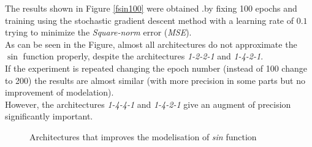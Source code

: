 \documentclass[a4paper, 11pt]{article}
\begin{document}
The results shown in Figure \ref{fsin100} were obtained 
.by fixing 100 epochs and training using the stochastic gradient descent method with a learning rate of $0.1$ trying to minimize the \textit{Square-norm} error (\textit{MSE}).\\
As can be seen in the Figure, almost all architectures do not approximate the $\sin$ function properly, despite the architectures \textit{1-2-2-1} and \textit{1-4-2-1}.\\
If the experiment is repeated changing the epoch number (instead of 100 change to 200) the results are almost similar (with more precision in some parts but no improvement of modelation).\\
However, the architectures \textit{1-4-4-1} and \textit{1-4-2-1} give an augment of precision significantly important.
\begin{figure}[h]
    \hspace{1em}
    \caption{Architectures that improves the modelisation of \textit{sin} function}
    \label{fsin200}
\end{figure}\\
\end{document}
